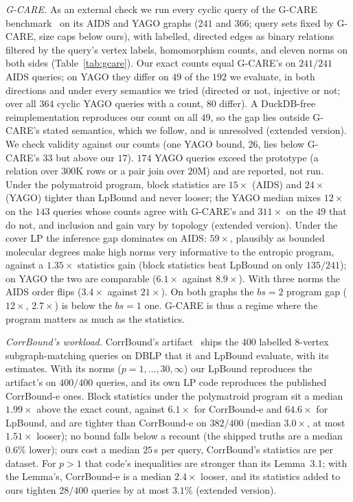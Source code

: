 \documentclass[sigconf, nonacm, acmthm=false]{acmart}
\begin{document}
\emph{G-CARE.} As an external check we run every cyclic query of the
G-CARE benchmark~\cite{park2020gcare} on its AIDS and YAGO graphs ($241$
and $366$; query sets fixed by G-CARE, size caps below ours), with
labelled, directed edges as binary relations filtered by the query's
vertex labels, homomorphism counts, and eleven norms on both sides
(Table~\ref{tab:gcare}). Our exact counts equal G-CARE's on $241/241$ AIDS
queries; on YAGO they differ on $49$ of the $192$ we evaluate, in both
directions and under every semantics we tried (directed or not, injective
or not; over all $364$ cyclic YAGO queries with a count, $80$ differ). A DuckDB-free reimplementation reproduces our count on all $49$, so the gap lies outside G-CARE's stated semantics, which we follow, and is unresolved (extended version). We check validity against our counts (one YAGO bound, $26$, lies
below G-CARE's $33$ but above our $17$). $174$ YAGO queries exceed the
prototype (a relation over $300$K rows or a pair join over $20$M) and are
reported, not run. Under the polymatroid program, block statistics are
$15\times$ (AIDS) and $24\times$ (YAGO) tighter than LpBound and never looser; the YAGO median mixes $12\times$ on the $143$ queries whose counts agree with G-CARE's and $311\times$ on the $49$ that do not, and inclusion and gain vary by topology (extended version). Under
the cover LP the inference gap dominates on AIDS: $59\times$, plausibly as bounded
molecular degrees make high norms very informative to the entropic
program, against a $1.35\times$ statistics gain (block statistics beat
LpBound on only $135/241$); on YAGO the two are comparable ($6.1\times$
against $8.9\times$). With three norms the AIDS order flips ($3.4\times$ against $21\times$). On both
graphs the $bs{=}2$ program gap ($12\times$, $2.7\times$) is below the
$bs{=}1$ one. G-CARE is thus a regime where the program matters as much as the statistics.

\emph{CorrBound's workload.} CorrBound's artifact~\cite{mayer2026corrbound}
ships the $400$ labelled $8$-vertex subgraph-matching queries on DBLP that it and LpBound evaluate, with
its estimates. With its norms ($p{=}1,\dots,30,\infty$) our LpBound
reproduces the artifact's on $400/400$ queries, and its own LP code reproduces the published CorrBound-e ones. Block statistics under the
polymatroid program sit a median $1.99\times$ above the exact count,
against $6.1\times$ for CorrBound-e and $64.6\times$ for LpBound, and are
tighter than CorrBound-e on $382/400$ (median $3.0\times$, at most
$1.51\times$ looser); no bound falls below a recount (the shipped truths are a median $0.6\%$ lower); ours cost a median $25$\,s per query, CorrBound's statistics are per dataset. For $p{>}1$ that code's inequalities are stronger than its Lemma~3.1; with the Lemma's, CorrBound-e is a median $2.4\times$ looser, and its statistics added to ours tighten $28/400$ queries by at most $3.1\%$ (extended version).
\end{document}
